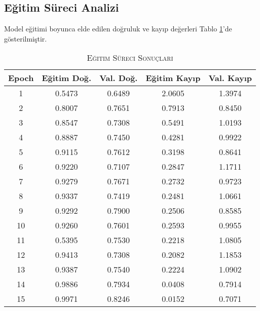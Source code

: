 \documentclass[conference, a4paper]{IEEEtran}
\begin{document}
	\subsection{Eğitim Süreci Analizi}
	
	Model eğitimi boyunca elde edilen doğruluk ve kayıp değerleri Tablo \ref{tablo_training}'de gösterilmiştir.
	
	\begin{table}[h]
		\centering
		\caption{\textsc{Eğitim Süreci Sonuçları}}
		\label{tablo_training}
		\begin{tabular}{|c|c|c|c|c|}
			\hline
			\textbf{Epoch} & \textbf{Eğitim Doğ.} & \textbf{Val. Doğ.} & \textbf{Eğitim Kayıp} & \textbf{Val. Kayıp} \\
			\hline
			1 & 0.5473 & 0.6489 & 2.0605 & 1.3974 \\
			\hline
			2 & 0.8007 & 0.7651 & 0.7913 & 0.8450 \\
			\hline
			3 & 0.8547 & 0.7308 & 0.5491 & 1.0193 \\
			\hline
			4 & 0.8887 & 0.7450 & 0.4281 & 0.9922 \\
			\hline
			5 & 0.9115 & 0.7612 & 0.3198 & 0.8641 \\
			\hline
			6 & 0.9220 & 0.7107 & 0.2847 & 1.1711 \\
			\hline
			7 & 0.9279 & 0.7671 & 0.2732 & 0.9723 \\
			\hline
			8 & 0.9337 & 0.7419 & 0.2481 & 1.0661 \\
			\hline
			9 & 0.9292 & 0.7900 & 0.2506 & 0.8585 \\
			\hline
			10 & 0.9260 & 0.7601 & 0.2593 & 0.9955 \\
			\hline
			11 & 0.5395 & 0.7530 & 0.2218 & 1.0805 \\
			\hline
			12 & 0.9413 & 0.7308 & 0.2082 & 1.1853 \\
			\hline
			13 & 0.9387 & 0.7540 & 0.2224 & 1.0902 \\
			\hline
			14 & 0.9886 & 0.7934 & 0.0408 & 0.7914 \\
			\hline
			15 & 0.9971 & 0.8246 & 0.0152 & 0.7071 \\
			\hline
		\end{tabular}
	\end{table}
	
\end{document}
